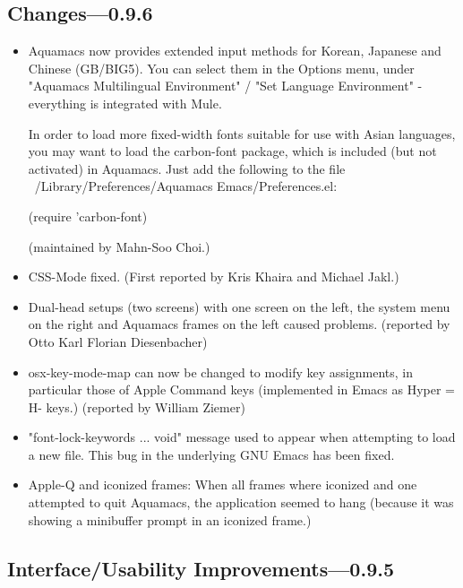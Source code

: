 \begin{itemize}
\end{itemize}

\subsection{Changes---0.9.6}

\begin{itemize}
\item Aquamacs now provides extended input methods for 
	Korean, Japanese and Chinese (GB/BIG5). You can select them in 
	the Options menu, under "Aquamacs Multilingual Environment" / 
	"Set Language Environment" - everything is integrated with
	Mule.   

	In order to load more fixed-width fonts suitable for use with
	Asian languages, you may want to load the carbon-font package,
	which is included (but not activated) in Aquamacs. Just add the
	following to the file 
	~/Library/Preferences/Aquamacs Emacs/Preferences.el:

	(require 'carbon-font)

	(maintained by   Mahn-Soo Choi.)
	
\item CSS-Mode fixed. 
	(First reported by Kris Khaira and Michael Jakl.)

\item Dual-head setups (two screens) with one screen on the left, 
	the system menu on the right and Aquamacs frames on the left 
	caused problems.	
	(reported by Otto Karl Florian Diesenbacher)
	
\item osx-key-mode-map can now be changed to modify key
	assignments, in particular those of Apple Command keys
	 (implemented in Emacs as Hyper = H- keys.)
	(reported by William Ziemer)

\item "font-lock-keywords ... void" message used to appear when
	attempting to load a new file. This bug in the underlying GNU
	Emacs has been fixed.

      \item Apple-Q and iconized frames: When all frames where
        iconized and one attempted to quit Aquamacs, the application
        seemed to hang (because it was showing a minibuffer prompt in
        an iconized frame.)
		
\end{itemize}


\subsection{Interface/Usability Improvements---0.9.5}


